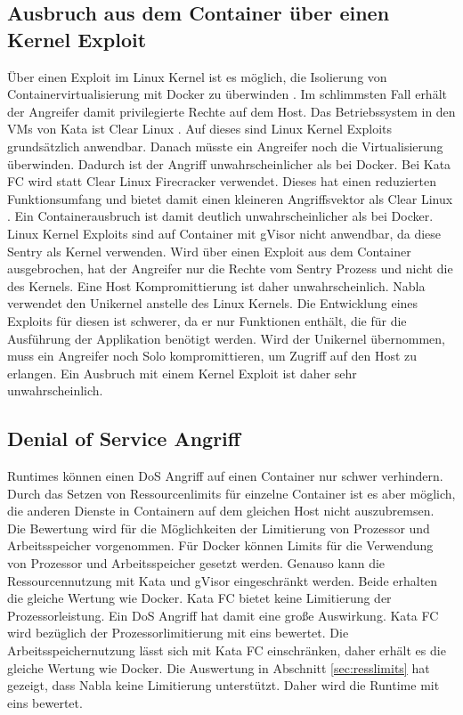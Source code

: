 \subsection{Ausbruch aus dem Container über einen Kernel Exploit}
Über einen Exploit im Linux Kernel ist es möglich, die Isolierung von Containervirtualisierung mit Docker zu überwinden \cite[vgl.][9]{OWASP.2019}. Im schlimmsten Fall erhält der Angreifer damit privilegierte Rechte auf dem Host.
Das Betriebssystem in den \acp{VM} von Kata ist Clear Linux  \cite[vgl.][107]{UdoSeidel.2018}. Auf dieses sind Linux Kernel Exploits grundsätzlich anwendbar. Danach müsste ein Angreifer noch die Virtualisierung überwinden. Dadurch ist der Angriff unwahrscheinlicher als bei Docker.
Bei Kata FC wird statt Clear Linux Firecracker verwendet. Dieses hat einen reduzierten Funktionsumfang und bietet damit einen kleineren Angriffsvektor als Clear Linux  \cite[vgl.][]{ArunGupta.2018}. Ein Containerausbruch ist damit deutlich unwahrscheinlicher als bei Docker.
Linux Kernel Exploits sind auf Container mit gVisor nicht anwendbar, da diese Sentry als Kernel verwenden. Wird über einen Exploit aus dem Container ausgebrochen, hat der Angreifer nur die Rechte vom Sentry Prozess und nicht die des Kernels. Eine Host Kompromittierung ist daher unwahrscheinlich.
Nabla verwendet den Unikernel anstelle des Linux Kernels. Die Entwicklung eines Exploits für diesen ist schwerer, da er nur Funktionen enthält, die für die Ausführung der Applikation benötigt werden. Wird der Unikernel übernommen, muss ein Angreifer noch Solo kompromittieren, um Zugriff auf den Host zu erlangen. Ein Ausbruch mit einem Kernel Exploit ist daher sehr unwahrscheinlich.

\subsection{Denial of Service Angriff}
\label{sec:auswertung_dos}
Runtimes können einen \ac{DoS} Angriff auf einen Container nur schwer verhindern. Durch das Setzen von Ressourcenlimits für einzelne Container ist es aber möglich, die anderen Dienste in Containern auf dem gleichen Host nicht auszubremsen. Die Bewertung wird für die Möglichkeiten der Limitierung von Prozessor und Arbeitsspeicher vorgenommen.
Für Docker können Limits für die Verwendung von Prozessor und Arbeitsspeicher gesetzt werden. Genauso kann die Ressourcennutzung mit Kata und gVisor eingeschränkt werden. Beide erhalten die gleiche Wertung wie Docker. Kata FC bietet keine Limitierung der Prozessorleistung. Ein DoS Angriff hat damit eine große Auswirkung. Kata FC wird bezüglich der Prozessorlimitierung mit eins bewertet. Die Arbeitsspeichernutzung lässt sich mit Kata FC einschränken, daher erhält es die gleiche Wertung wie Docker. Die Auswertung in Abschnitt \ref{sec:resslimits} hat gezeigt, dass Nabla keine Limitierung unterstützt. Daher wird die Runtime mit eins bewertet.

